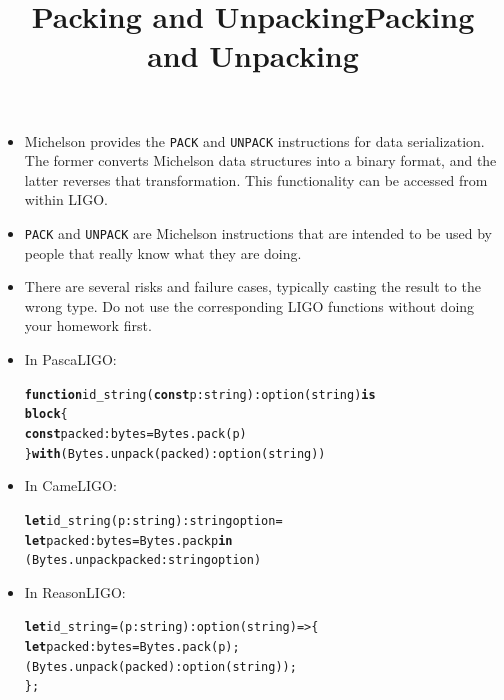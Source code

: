 \documentclass[wide]{slides}
\newcommand{\Kblock}[0]{\textbf{block}\xspace}
\newcommand{\Kconst}[0]{\textbf{const}\xspace}
\newcommand{\Kfunction}[0]{\textbf{function}\xspace}
\newcommand{\Kin}[0]{\textbf{in}\xspace}
\newcommand{\Kis}[0]{\textbf{is}\xspace}
\newcommand{\Kwith}[0]{\textbf{with}\xspace}
\newcommand{\Klet}[0]{\textbf{let}\xspace}
\begin{document}
\begin{slide}
  \title{Packing and Unpacking}

  \begin{itemize}

    \item Michelson provides the \texttt{PACK} and \texttt{UNPACK}
      instructions for data serialization.  The former converts
      Michelson data structures into a binary format, and the latter
      reverses that transformation. This functionality can be accessed
      from within LIGO.

    \item \texttt{PACK} and \texttt{UNPACK} are Michelson instructions
      that are intended to be used by people that really know what
      they are doing.

    \item There are several risks and failure cases, typically casting
      the result to the wrong type. Do not use the corresponding LIGO
      functions without doing your homework first.

  \end{itemize}

\end{slide}

\begin{slide}
  \title{Packing and Unpacking}

  \begin{itemize}

    \item In PascaLIGO:
      \begin{alltt}
\Kfunction id_string (\Kconst p : string) : option (string) \Kis
  \Kblock \{
    \Kconst packed : bytes = Bytes.pack (p)
  \} \Kwith (Bytes.unpack (packed) : option (string))
      \end{alltt}

    \item In CameLIGO:
      \begin{alltt}
\Klet id_string (p : string) : string option =
  \Klet packed : bytes = Bytes.pack p \Kin
  (Bytes.unpack packed : string option)
      \end{alltt}

    \item In ReasonLIGO:
      \begin{alltt}
\Klet id_string = (p : string) : option (string) => \{
  \Klet packed : bytes = Bytes.pack (p);
  (Bytes.unpack (packed) : option (string));
\};
      \end{alltt}
  \end{itemize}

\end{slide}
\end{document}
